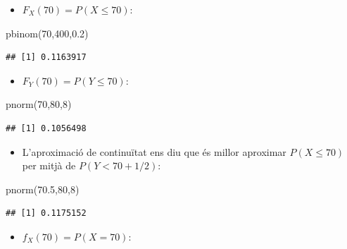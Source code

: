\documentclass[
]{book}
\newenvironment{Shaded}{\begin{snugshade}}{\end{snugshade}}
\newcommand{\DecValTok}[1]{\textcolor[rgb]{0.00,0.00,0.81}{#1}}
\newcommand{\FloatTok}[1]{\textcolor[rgb]{0.00,0.00,0.81}{#1}}
\newcommand{\FunctionTok}[1]{\textcolor[rgb]{0.00,0.00,0.00}{#1}}
\newcommand{\NormalTok}[1]{#1}
\providecommand{\tightlist}{%
  \setlength{\itemsep}{0pt}\setlength{\parskip}{0pt}}
\renewcommand{\leq}{\leqslant}
\theoremstyle{definition}
\theoremstyle{definition}
\theoremstyle{definition}
\theoremstyle{remark}
\begin{document}
\begin{itemize}
\tightlist
\item
  \(F_X(70)=P(X\leq 70)\):
\end{itemize}

\begin{Shaded}
\begin{Highlighting}[]
\FunctionTok{pbinom}\NormalTok{(}\DecValTok{70}\NormalTok{,}\DecValTok{400}\NormalTok{,}\FloatTok{0.2}\NormalTok{)}
\end{Highlighting}
\end{Shaded}

\begin{verbatim}
## [1] 0.1163917
\end{verbatim}

\begin{itemize}
\tightlist
\item
  \(F_Y(70)=P(Y\leq 70)\):
\end{itemize}

\begin{Shaded}
\begin{Highlighting}[]
\FunctionTok{pnorm}\NormalTok{(}\DecValTok{70}\NormalTok{,}\DecValTok{80}\NormalTok{,}\DecValTok{8}\NormalTok{)}
\end{Highlighting}
\end{Shaded}

\begin{verbatim}
## [1] 0.1056498
\end{verbatim}

\begin{itemize}
\tightlist
\item
  L'aproximació de continuïtat ens diu que és millor aproximar \(P(X\leq 70)\) per mitjà de \(P(Y< 70+1/2)\):
\end{itemize}

\begin{Shaded}
\begin{Highlighting}[]
\FunctionTok{pnorm}\NormalTok{(}\FloatTok{70.5}\NormalTok{,}\DecValTok{80}\NormalTok{,}\DecValTok{8}\NormalTok{)}
\end{Highlighting}
\end{Shaded}

\begin{verbatim}
## [1] 0.1175152
\end{verbatim}

\begin{itemize}
\tightlist
\item
  \(f_X(70)=P(X=70)\):
\end{itemize}
\end{document}
